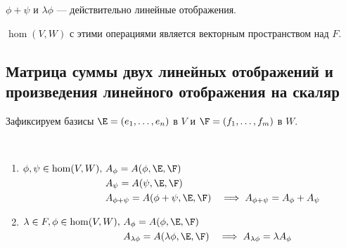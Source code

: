 \begin{exercise}
    $\phi + \psi$ и $\lambda \phi$ --- действительно линейные отображения.
\end{exercise}

\begin{exercise}
    $\hom(V, W)$ с этими операциями является векторным пространством над $F$.
\end{exercise}


\subsection{Матрица суммы двух линейных отображений и произведения линейного отображения на скаляр}

Зафиксируем базисы $\E = (e_1, \dots, e_n)$ в $V$ и $\F = (f_1, \dots, f_m)$ в $W$.

\begin{proposal}~
    \begin{enumerate}
    \item
        \begin{math}
            \begin{aligned}[t]
                \phi, \psi \in \hom(V, W), \
                &A_\phi = A(\phi, \E, \F)& \\
                &A_\psi = A(\psi, \E, \F)& \\
                &A_{\phi + \psi} = A(\phi + \psi, \E, \F)& \implies A_{\phi + \psi} = A_\phi + A_\psi
            \end{aligned}
        \end{math}

    \item
        \begin{math}
            \begin{aligned}[t]
                \lambda \in F, \phi \in \hom(V, W), \
                &A_\phi = A(\phi, \E, \F)& \\
                &A_{\lambda \phi} = A(\lambda \phi, \E, \F)& \implies A_{\lambda \phi} = \lambda A_\phi
            \end{aligned}
        \end{math}
    \end{enumerate}
\end{proposal}

